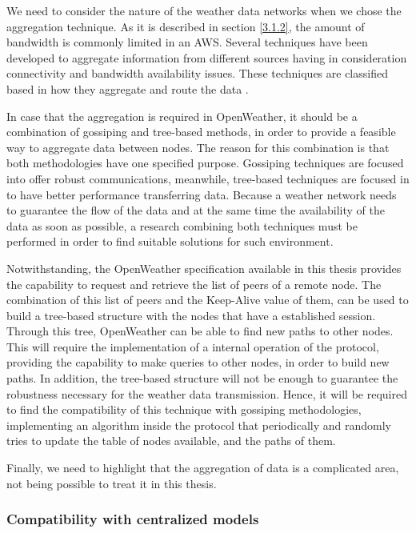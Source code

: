 We need to consider the nature of the weather data networks when we chose the aggregation technique. As it is described in section \ref{3.1.2}, the amount of bandwidth is commonly limited in an \gls{AWS}. Several techniques have been developed to aggregate information from different sources having in consideration connectivity and bandwidth availability issues. These techniques are classified based in how they aggregate and route the data \cite{Ogston09peer-to-peeraggregation}. 

In case that the aggregation is required in OpenWeather, it should be a combination of gossiping and tree-based methods, in order to provide a feasible way to aggregate data between nodes. The reason for this combination is that both methodologies have one specified purpose. Gossiping techniques are focused into offer robust communications, meanwhile, tree-based techniques are focused in to have better performance transferring data. Because a weather network needs to guarantee the flow of the data and at the same time the availability of the data as soon as possible, a research combining both techniques must be performed in order to find suitable solutions for such environment.

Notwithstanding, the OpenWeather specification available in this thesis provides the capability to request and retrieve the list of peers of a remote node. The combination of this list of peers and the Keep-Alive value of them, can be used to build a tree-based structure with the nodes that have a established session.
Through this tree, OpenWeather can be able to find new paths to other nodes. This will require the implementation of a internal operation of the protocol, providing the capability to make queries to other nodes, in order to build new paths. In addition, the tree-based structure will not be enough to guarantee the robustness necessary for the weather data transmission. Hence, it will be required to find the compatibility of this technique with gossiping methodologies, implementing an algorithm inside the protocol that periodically and randomly tries to update  the table of nodes available, and the paths of them.

Finally, we need to highlight that the aggregation of data is a complicated area, not being possible to treat it in this thesis.

\subsubsection{Compatibility with centralized models}

